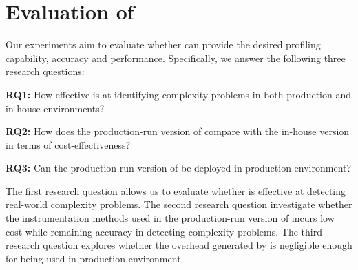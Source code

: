 \section{Evaluation of \Tool}
\label{sec:eva}


Our experiments aim to evaluate whether \Tool 
can provide the desired profiling capability, accuracy and performance. 
Specifically, we answer the following three research questions:


\vspace*{3pt}
\noindent
 {\bf RQ1:} 
How effective is \Tool at identifying complexity problems
in both production and in-house environments?

\vspace*{3pt}
\noindent
{\bf RQ2:}
How does the production-run version of \Tool 
compare with the in-house version in terms of
cost-effectiveness?

\vspace*{3pt}
\noindent
{\bf RQ3:}
Can the production-run version of \Tool be deployed
in production environment?







\vspace*{2pt}


The first research question allows us to evaluate whether \Tool is effective 
at detecting real-world complexity problems. 
The second research question investigate whether the instrumentation methods 
used in the production-run version of \Tool incurs low cost while remaining
accuracy in detecting complexity problems. 
The third research question explores whether the overhead generated 
by \Tool is negligible enough for being used in production environment.



